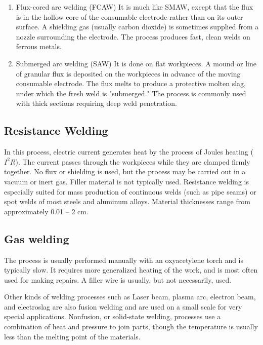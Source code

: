 \documentclass[a4paper,openany,12pt]{book}
\begin{document}
{{\begin{enumerate}
\item Flux-cored arc welding (FCAW)
\label{flux-cored-arc-welding-fcaw}
It is much like SMAW, except that the flux is in the hollow core of the
consumable electrode rather than on its outer surface. A shielding gas
(usually carbon dioxide) is sometimes supplied from a nozzle surrounding
the electrode. The process produces fast, clean welds on ferrous metals.

\item Submerged arc welding (SAW)
\label{submerged-arc-welding-saw}
It is done on flat workpieces. A mound or line of granular flux is
deposited on the workpieces in advance of the moving consumable
electrode. The flux melts to produce a protective molten slag, under
which the fresh weld is "submerged." The process is commonly used with
thick sections requiring deep weld penetration.
\end{enumerate}

\subsection{Resistance Welding}
\label{resistance-welding}
In this process, electric current generates heat by the process of
Joules heating (\(I^2R\)). The current passes through the workpieces while
they are clamped firmly together. No flux or shielding is used, but the
process may be carried out in a vacuum or inert gas. Filler material is
not typically used. Resistance welding is especially suited for mass
production of continuous welds (such as pipe seams) or spot welds of
most steels and aluminum alloys. Material thicknesses range from
approximately 0.01 -- 2 cm.

\subsection{Gas welding}
\label{gas-welding}
The process is usually performed manually with an oxyacetylene torch and
is typically slow. It requires more generalized heating of the work, and
is most often used for making repairs. A filler wire is usually, but not
necessarily, used.

Other kinds of welding processes such as Laser beam, plasma arc,
electron beam, and electroslag are also fusion welding and are used on a
small scale for very special applications. Nonfusion, or solid-state
welding, processes use a combination of heat and pressure to join parts,
though the temperature is usually less than the melting point of the
materials.

}}
\end{document}
